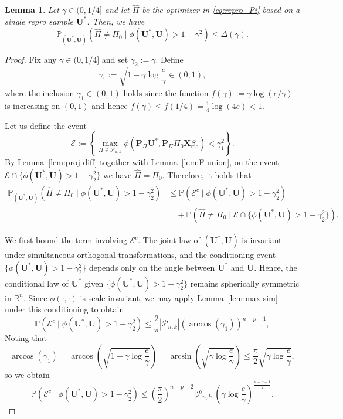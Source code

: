 \documentclass[10pt,a4paper]{amsart}
\newtheorem{lemma}{Lemma}
\newcommand{\R}{\mathbb{R}}
\newcommand{\bP}{\mathbb{P}}
\renewcommand{\le}{\leqslant}
\newcommand{\mP}{\mathcal{P}}
\begin{document}
\begin{lemma}\label{lem:inconsistency}
Let $\gamma\in(0,1/4]$ and let $\widehat{\Pi}$ be the optimizer in \eqref{eq:repro_Pi} based on a single repro sample $\bm U^*$. Then, we have
\[
\bP_{(\bm U^*,\bm U)}\left(
\widehat{\Pi}\neq \Pi_0 \mid \phi(\bm U^*,\bm U)>1-\gamma^2
\right)
\le \Delta(\gamma).
\]
\end{lemma}

\begin{proof}
Fix any $\gamma\in(0,1/4]$ and set $\gamma_2:=\gamma$.  Define 
\[
\gamma_1
:=
\sqrt{1-\gamma\log\frac{e}{\gamma}}
\in(0,1),
\]
where the inclusion $\gamma_1\in(0,1)$ holds since the function
$f(\gamma):=\gamma\log(e/\gamma)$ is increasing on $(0,1)$ and hence
$f(\gamma)\le f(1/4)=\frac14\log(4e)<1$.

Let us define the event
\[
\mathcal{E}
:=
\left\{
\max_{\Pi\in\mP_{n,k}}
\phi\left(
\bm P_\Pi \bm U^*,
\bm P_\Pi \Pi_0 \bm X\beta_0
\right)
<
\gamma_1^2
\right\}.
\]
By Lemma~\ref{lem:proj-diff} together with Lemma~\ref{lem:F-union}, on the event
$\mathcal{E}\cap\{\phi(\bm U^*,\bm U)>1-\gamma_2^2\}$ we have $\widehat{\Pi}=\Pi_0$.
Therefore, it holds that
\begin{align}
\bP_{(\bm U^*,\bm U)}\left(
\widehat{\Pi}\neq \Pi_0
\mid 
\phi(\bm U^*,\bm U)>1-\gamma_2^2
\right)
&\le
\bP\left(
\mathcal{E}^c
\mid 
\phi(\bm U^*,\bm U)>1-\gamma_2^2
\right)
\nonumber\\
&\quad+
\bP\left(
\widehat{\Pi}\neq \Pi_0
\mid
\mathcal{E}\cap\{\phi(\bm U^*,\bm U)>1-\gamma_2^2\}
\right).
\label{eq:inconsistency-split}
\end{align}

We first bound the term involving $\mathcal{E}^c$.
The joint law of $(\bm U^*,\bm U)$ is invariant under simultaneous orthogonal
transformations, and the conditioning event
$\{\phi(\bm U^*,\bm U)>1-\gamma_2^2\}$ depends only on the angle between
$\bm U^*$ and $\bm U$. Hence, the conditional law of $\bm U^*$ given
$\{\phi(\bm U^*,\bm U)>1-\gamma_2^2\}$ remains spherically symmetric in
$\R^n$. Since $\phi(\cdot,\cdot)$ is scale-invariant, we may apply
Lemma~\ref{lem:max-sim} under this conditioning to obtain
\[
\bP\left(
\mathcal{E}^c
 \mid 
\phi(\bm U^*,\bm U)>1-\gamma_2^2
\right)
\le
\frac{2}{\pi}|\mP_{n,k}|
\left(\arccos(\gamma_1)\right)^{n-p-1},
\]
Noting that
\[
\arccos(\gamma_1)
=
\arccos\left(\sqrt{1-\gamma\log\frac{e}{\gamma}}\right)
=
\arcsin\left(\sqrt{\gamma\log\frac{e}{\gamma}}\right)
\le
\frac{\pi}{2}\sqrt{\gamma\log\frac{e}{\gamma}},
\]
so we obtain
\[
\bP\left(
\mathcal{E}^c
 \mid 
\phi(\bm U^*,\bm U)>1-\gamma_2^2
\right)
\le
\left(\frac{\pi}{2}\right)^{n-p-2}|\mP_{n,k}|
\left(
\gamma\log\frac{e}{\gamma}
\right)^{\frac{n-p-1}{2}}.
\]


\end{proof}
\end{document}
